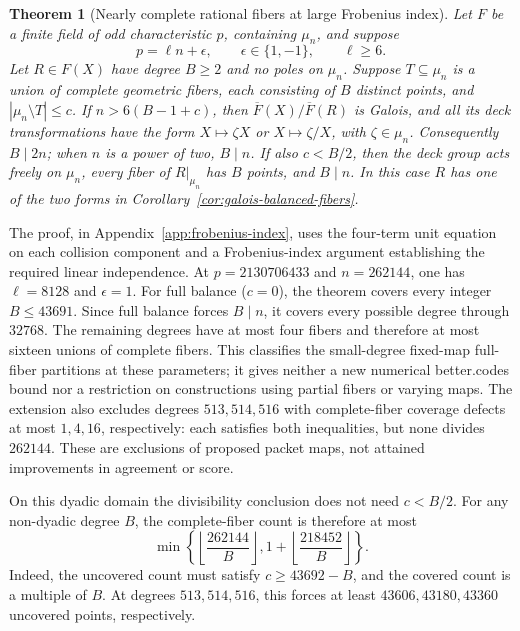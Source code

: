 \documentclass[11pt,letterpaper]{article}
\newtheorem{theorem}{Theorem}[section]
\theoremstyle{definition}
\theoremstyle{remark}
\begin{document}
\begin{theorem}[Nearly complete rational fibers at large Frobenius index]
\label{thm:frobenius-index-fibers}
Let $F$ be a finite field of odd characteristic $p$, containing
$\mu_n$, and suppose
\[
 p=\ell n+\epsilon,\qquad \epsilon\in\{1,-1\},\qquad \ell\ge6.
\]
Let $R\in F(X)$ have degree $B\ge2$ and no poles on $\mu_n$.
Suppose $T\subseteq\mu_n$ is a union of complete geometric fibers,
each consisting of $B$ distinct points, and $|\mu_n\setminus T|\le c$.
If $n>6(B-1+c)$, then $\overline F(X)/\overline F(R)$ is Galois,
and all its deck transformations have the form $X\mapsto\zeta X$
or $X\mapsto\zeta/X$, with $\zeta\in\mu_n$.
Consequently $B\mid2n$; when $n$ is a power of two, $B\mid n$.
If also $c<B/2$, then the deck group acts freely on $\mu_n$,
every fiber of $R|_{\mu_n}$ has $B$ points, and $B\mid n$.
In this case $R$ has one of the two forms in
Corollary~\ref{cor:galois-balanced-fibers}.
\end{theorem}

The proof, in Appendix~\ref{app:frobenius-index}, uses the
four-term unit equation on each collision component and a
Frobenius-index argument establishing the required linear independence.
At $p=2130706433$ and $n=262144$, one has $\ell=8128$ and
$\epsilon=1$. For full balance ($c=0$), the theorem covers every
integer $B\le43691$.
Since full balance forces $B\mid n$, it covers every possible degree
through $32768$. The remaining degrees have at most four fibers and
therefore at most sixteen unions of complete fibers. This classifies
the small-degree fixed-map full-fiber partitions at these parameters;
it gives neither a new numerical better.codes bound nor a restriction
on constructions using partial fibers or varying maps.
The extension also excludes degrees $513,514,516$ with complete-fiber
coverage defects at most $1,4,16$, respectively: each satisfies both
inequalities, but none divides $262144$. These are exclusions of
proposed packet maps, not attained improvements in agreement or score.

On this dyadic domain the divisibility conclusion does not need
$c<B/2$. For any non-dyadic degree $B$, the complete-fiber count is
therefore at most
\[
 \min\left\{\left\lfloor\frac{262144}{B}\right\rfloor,
                1+\left\lfloor\frac{218452}{B}\right\rfloor\right\}.
\]
Indeed, the uncovered count must satisfy $c\ge43692-B$, and the
covered count is a multiple of $B$. At degrees $513,514,516$, this
forces at least $43606,43180,43360$ uncovered points, respectively.
\end{document}
